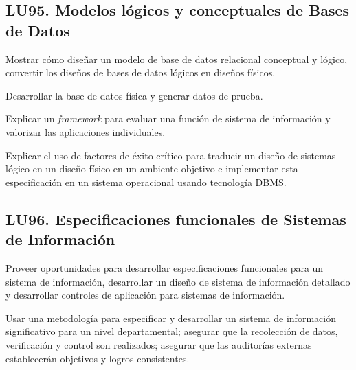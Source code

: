 \subsection{LU95. Modelos lógicos y conceptuales de Bases de Datos}\label{sec:LU95}
\begin{LearningUnit}
\begin{LUGoal}
\item Mostrar cómo diseñar un modelo de base de datos relacional conceptual y lógico, convertir los diseños de bases de datos lógicos en diseños físicos.
\end{LUGoal}

\begin{LUObjective}
\item Desarrollar la base de datos física y generar datos de prueba.
\item Explicar un {\it framework} para evaluar una función de sistema de información y valorizar las aplicaciones individuales.
\item Explicar el uso de factores de éxito crítico para traducir un diseño de sistemas lógico en un diseño físico en un ambiente objetivo e implementar esta especificación en un sistema operacional usando tecnología DBMS.
\end{LUObjective}
\end{LearningUnit}

\subsection{LU96. Especificaciones funcionales de Sistemas de Información}\label{sec:LU96}
\begin{LearningUnit}
\begin{LUGoal}
\item Proveer oportunidades para desarrollar especificaciones funcionales para un sistema de información, desarrollar un diseño de sistema de información detallado y desarrollar controles de aplicación para sistemas de información.
\end{LUGoal}

\begin{LUObjective}
\item Usar una metodología para especificar y desarrollar un sistema de información significativo para un nivel departamental; asegurar que la recolección de datos, verificación y control son realizados; asegurar que las auditorías externas establecerán objetivos y logros consistentes.
\end{LUObjective}
\end{LearningUnit}

